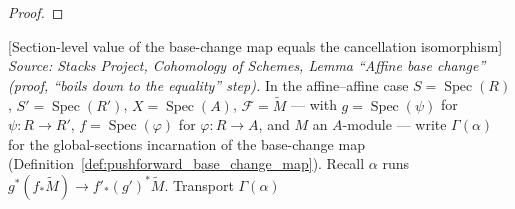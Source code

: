 \begin{proof}
\end{proof}

\begin{lemma}


[Section-level value of the base-change map equals the cancellation isomorphism]
  \label{lem:pushforward_base_change_mate_cancelBaseChange}
  \textit{Source: Stacks Project, Cohomology of Schemes, Lemma ``Affine base
  change'' (proof, ``boils down to the equality'' step).}
  In the affine--affine case \(S = \operatorname{Spec}(R)\),
  \(S' = \operatorname{Spec}(R')\), \(X = \operatorname{Spec}(A)\),
  \(\mathcal{F} = \widetilde{M}\) — with \(g = \operatorname{Spec}(\psi)\) for
  \(\psi : R \to R'\), \(f = \operatorname{Spec}(\varphi)\) for \(\varphi : R \to A\),
  and \(M\) an \(A\)-module — write \(\Gamma(\alpha)\) for the global-sections
  incarnation of the base-change map (Definition~\ref{def:pushforward_base_change_map}).
  Recall \(\alpha\) runs
  \(g^*(f_*\widetilde{M}) \to f'_*(g')^*\widetilde{M}\). Transport \(\Gamma(\alpha)\)

\end{lemma}
